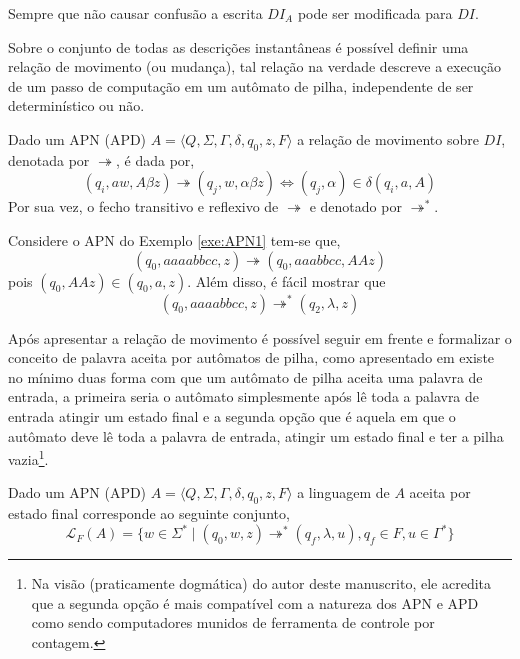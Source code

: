\begin{remark}
    Sempre que não causar confusão a escrita $DI_A$ pode ser modificada para $DI$.
\end{remark}

Sobre o conjunto de todas as descrições instantâneas é possível definir uma relação de movimento (ou mudança), tal relação na verdade descreve a execução de um passo de computação em um autômato de pilha, independente de ser determinístico ou não.

\begin{definition}
    Dado um APN (APD) $A = \langle Q, \Sigma, \Gamma, \delta, q_0, z, F\rangle$ a relação de movimento sobre $DI$, denotada por $\twoheadrightarrow$, é dada por, 
    \begin{equation}
        (q_i, aw, A\beta z) \twoheadrightarrow (q_j, w, \alpha\beta z) \Longleftrightarrow (q_j, \alpha) \in \delta(q_i, a, A)
    \end{equation}
    Por sua vez, o fecho transitivo e reflexivo de $\twoheadrightarrow$ e denotado por $\twoheadrightarrow^*$.
\end{definition}

\begin{example}
    Considere o APN do Exemplo \ref{exe:APN1} tem-se que,
    $$(q_0, aaaabbcc, z) \twoheadrightarrow (q_0, aaabbcc, AAz)$$
    pois $(q_0, AAz) \in (q_0, a, z)$. Além disso, é fácil mostrar que
    $$(q_0, aaaabbcc, z) \twoheadrightarrow^* (q_2, \lambda, z)$$
\end{example}

Após apresentar a relação de movimento é possível seguir em frente e formalizar o conceito de palavra aceita por autômatos de pilha, como apresentado em \cite{harrison1978} existe no mínimo duas forma com que um autômato de pilha aceita uma palavra de entrada, a primeira seria o autômato simplesmente após lê toda a palavra de entrada atingir um estado final e a segunda opção que é aquela em que o autômato deve lê toda a palavra de entrada, atingir um estado final e ter a pilha vazia\footnote{Na visão (praticamente dogmática) do autor deste manuscrito, ele acredita que a segunda opção é mais compatível com a natureza dos APN e APD como sendo computadores munidos de ferramenta de controle por contagem.}.

\begin{definition}
    Dado um APN (APD) $A = \langle Q, \Sigma, \Gamma, \delta, q_0, z, F\rangle$ a linguagem de $A$ aceita por estado final corresponde ao seguinte conjunto, 
    \begin{equation}
        \mathcal{L}_{F}(A) = \{w \in \Sigma^* \mid (q_0, w, z) \twoheadrightarrow^* (q_f, \lambda, u), q_f \in F, u \in \Gamma^*\}
    \end{equation}
\end{definition}

